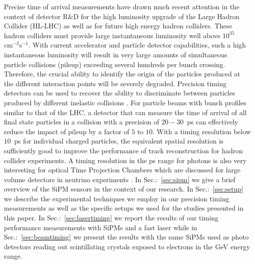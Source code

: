 Precise time of arrival measurements have drawn much recent attention in the 
context of detector R\&D for the high luminosity upgrade of the Large Hadron 
Collider (HL-LHC) as well as for future high energy hadron colliders.  
These hadron colliders must provide large 
instantaneous luminosity well above $10^{35}$~$\mathrm{cm}^{-2}\mathrm{s}^{-1}$.
With current accelerator and particle detector capabilities, such a high 
instantaneous luminosity will result in very large amounts
of simultaneous particle collisions (pileup) exceeding several hundreds per
bunch crossing. Therefore, the crucial ability to identify the origin 
of the particles produced at the different interaction points will be severely 
degraded. Precision timing detectors can be used to recover the ability to 
discriminate between particles produced by different inelastic collisions \cite{adielba}.
For particle beams with bunch profiles similar to that of the LHC, a detector 
that can measure the time of arrival of all final state particles in a collision
with a precision of $20-30$~ps can effectively reduce the impact of
pileup by a factor of $5$ to $10$. 
%
% 
% 
With a timing resolution below $10$~ps for individual charged particles, the equivalent spatial 
resolution is sufficiently good to improve the performance of 
track reconstruction \cite{4dtracking} for hadron collider experiments.
A timing resolution in the ps range for photons is also very interesting for optical Time Projection Chambers 
which are discussed for large volume detectors in neutrino experiments \cite{lappd, otpc}. 
%
%
%
In Sec.:~\ref{sec:sipm} we give a brief overview of the SiPM sensors in the context of our research. In Sec.:~\ref{sec:setup} 
we describe the experimental techniques we employ in our precision timing measurements as well as the specific setups we 
used for the studies presented in this paper. In Sec.:~\ref{sec:lasertiming} we report the results of our timing 
performance measurements with SiPMs and a fast laser while in Sec.:~\ref{sec:beamtiming} we present the results 
with the same SiPMs used as photo detectors reading out scintillating crystals exposed to electrons in the GeV energy range.

